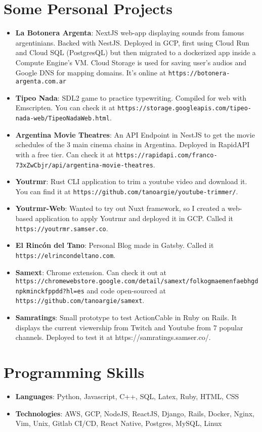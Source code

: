 \documentclass[letterpaper,11pt]{article}
\newcommand{\resumeItem}[2]{
  \item\small{
    \textbf{#1}{: #2 \vspace{-2pt}}
  }
}
\newcommand{\resumeSubItem}[2]{\resumeItem{#1}{#2}\vspace{-4pt}}
\newcommand{\resumeSubHeadingListStart}{\begin{itemize}[leftmargin=*]}
\newcommand{\resumeSubHeadingListEnd}{\end{itemize}}
\begin{document}
\section{Some Personal Projects}
 \resumeSubHeadingListStart
   \resumeSubItem{La Botonera Argenta}
     {NextJS web-app displaying sounds from famous argentinians. Backed with NestJS. Deployed in GCP, first using Cloud Run and Cloud SQL (PostgresQL) but then migrated to a dockerized app inside a Compute Engine's VM. Cloud Storage is used for saving user's audios and Google DNS for mapping domains. It's online at \nolinkurl{https://botonera-argenta.com.ar}}
   \resumeSubItem{Tipeo Nada}
     {SDL2 game to practice typewriting. Compiled for web with Emscripten. You can check it at \nolinkurl{https://storage.googleapis.com/tipeo-nada-web/TipeoNadaWeb.html}.}
   \resumeSubItem{Argentina Movie Theatres}
     {An API Endpoint in NestJS to get the movie schedules of the 3 main cinema chains in Argentina. Deployed in RapidAPI with a free tier. Can check it at \nolinkurl{https://rapidapi.com/franco-73xZwCbjr/api/argentina-movie-theatres}.}
   \resumeSubItem{Youtrmr}
     {Rust CLI application to trim a youtube video and download it. You can find it at \nolinkurl{https://github.com/tanoargie/youtube-trimmer/}.}
   \resumeSubItem{Youtrmr-Web}
     {Wanted to try out Nuxt framework, so I created a web-based application to apply Youtrmr and deployed it in GCP. Called it \nolinkurl{https://youtrmr.samser.co}.}
   \resumeSubItem{El Rincón del Tano}
     {Personal Blog made in Gatsby. Called it \nolinkurl{https://elrincondeltano.com}.}
   \resumeSubItem{Samext}
     {Chrome extension. Can check it out at \nolinkurl{https://chromewebstore.google.com/detail/samext/folkogmaemenfaebhgdnpkminckfppdd?hl=es} and code open-sourced at \nolinkurl{https://github.com/tanoargie/samext}.}
   \resumeSubItem{Samratings}
     {Small prototype to test ActionCable in Ruby on Rails. It displays the current viewership from Twitch and Youtube from 7 popular channels. Deployed to test it at https://samratings.samser.co/.}
 \resumeSubHeadingListEnd


\section{Programming Skills}
  \resumeSubHeadingListStart
    \item{
      \textbf{Languages}{: Python, Javascript, C++, SQL, Latex, Ruby, HTML, CSS}
    }
    \item{
      \textbf{Technologies}{: AWS, GCP, NodeJS, ReactJS, Django, Rails, Docker, Nginx, Vim, Unix, Gitlab CI/CD, React Native, Postgres, MySQL, Linux}
    }
  \resumeSubHeadingListEnd


\end{document}
